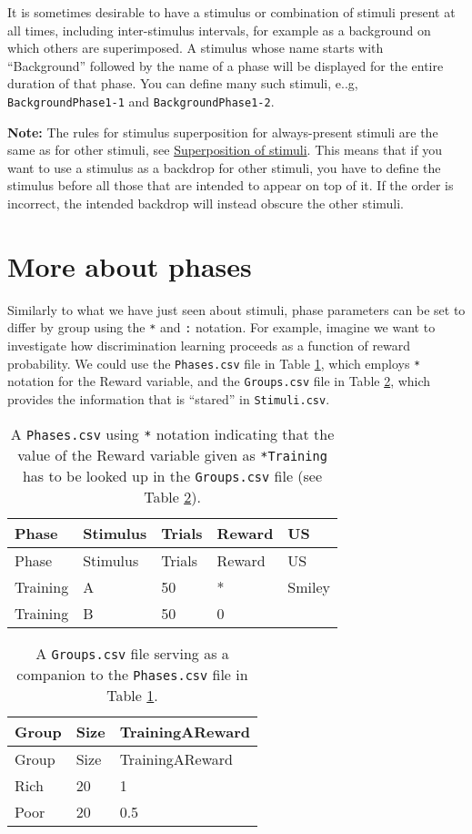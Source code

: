 \documentclass[11pt,]{article}
\begin{document}
It is sometimes desirable to have a stimulus or combination of stimuli
present at all times, including inter-stimulus intervals, for example as
a background on which others are superimposed. A stimulus whose name
starts with ``Background'' followed by the name of a phase will be
displayed for the entire duration of that phase. You can define many
such stimuli, e..g, \texttt{BackgroundPhase1-1} and
\texttt{BackgroundPhase1-2}.

\textbf{Note:} The rules for stimulus superposition for always-present
stimuli are the same as for other stimuli, see
\hyperref[stimulus-superposition]{Superposition of stimuli}. This means
that if you want to use a stimulus as a backdrop for other stimuli, you
have to define the stimulus before all those that are intended to appear
on top of it. If the order is incorrect, the intended backdrop will
instead obscure the other stimuli.

\section{More about phases}\label{more-about-phases}

Similarly to what we have just seen about stimuli, phase parameters can
be set to differ by group using the \texttt{*} and \texttt{:} notation.
For example, imagine we want to investigate how discrimination learning
proceeds as a function of reward probability. We could use the
\texttt{Phases.csv} file in Table \ref{phases-star-notation}, which
employs \texttt{*} notation for the Reward variable, and the
\texttt{Groups.csv} file in Table \ref{groups-phases-star-notation},
which provides the information that is ``stared'' in
\texttt{Stimuli.csv}.

\begin{longtable}[c]{@{}lllll@{}}
\caption{A \texttt{Phases.csv} using \texttt{*} notation indicating that
the value of the Reward variable given as \texttt{*Training} has to be
looked up in the \texttt{Groups.csv} file (see Table
\ref{groups-phases-star-notation}).
\label{phases-star-notation}}\tabularnewline
\toprule
Phase & Stimulus & Trials & Reward & US\tabularnewline
\midrule
\endfirsthead
\toprule
Phase & Stimulus & Trials & Reward & US\tabularnewline
\midrule
\endhead
Training & A & 50 & * & Smiley\tabularnewline
Training & B & 50 & 0 &\tabularnewline
\bottomrule
\end{longtable}

\begin{longtable}[c]{@{}lll@{}}
\caption{A \texttt{Groups.csv} file serving as a companion to the
\texttt{Phases.csv} file in Table \ref{phases-star-notation}.
\label{groups-phases-star-notation}}\tabularnewline
\toprule
Group & Size & TrainingAReward\tabularnewline
\midrule
\endfirsthead
\toprule
Group & Size & TrainingAReward\tabularnewline
\midrule
\endhead
Rich & 20 & 1\tabularnewline
Poor & 20 & 0.5\tabularnewline
\bottomrule
\end{longtable}
\end{document}
